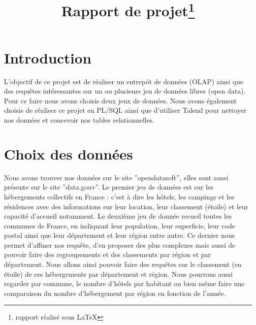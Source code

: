 \documentclass[a4paper,sffamily,12pt]{article}
\title{\vspace{\fill}\LARGE\bfseries\sffamily Rapport de projet\protect\footnote{rapport réalisé sous \LaTeX} \vspace{\fill}}
\begin{document}
	\date{} %
	\maketitle %

	\thispagestyle{fancy} %
	
	\newpage
			
	\renewcommand{\contentsname}{Sommaire}
	\tableofcontents
	
	\newpage
	
	\section{Introduction}

		\vspace{0.5cm}
		
		L'objectif de ce projet est de réaliser un entrepôt de données (OLAP) ainsi que des requêtes intéressantes sur un ou plusieurs jeu de données libres (open data). Pour ce faire nous avons choisis deux jeux de données. Nous avons également choisis de réaliser ce projet en PL/SQL ainsi que d'utiliser Talend pour nettoyer nos données et concevoir nos tables relationnelles. \\


	\section{Choix des données}				

		\vspace{0.5cm}
		
		 Nous avons trouver nos données sur le site ''opendatasoft'', elles sont aussi présente sur le site ''data.gouv''. Le premier jeu de données est sur les hébergements collectifs en France : c'est à dire les hôtels, les campings et les résidences avec des informations sur leur location, leur classement (étoile) et leur capacité d'accueil notamment. Le deuxième jeu de donnée recueil toutes les communes de France, en indiquant leur population, leur superficie, leur code postal ainsi que leur département et leur région entre autre. Ce dernier nous permet d'affiner nos requête, d'en proposer des plus complexes mais aussi de pouvoir faire des regroupements et des classements par région et par département. Nous allons ainsi pouvoir faire des requêtes sur le classement (en étoile) de ces hébergements par département et région. Nous pourrons aussi regarder par commune, le nombre d'hôtels par habitant ou bien même faire une comparaison du nombre d'hébergement par région en fonction de l'année. \\
\end{document}
